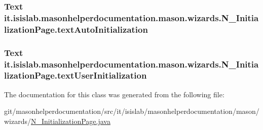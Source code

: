\hypertarget{classit_1_1isislab_1_1masonhelperdocumentation_1_1mason_1_1wizards_1_1_n___initialization_page_a839ed55d6a19462f54d279cb70a0573f}{
\subsubsection[{text\-Auto\-Initialization}]{\setlength{\rightskip}{0pt plus 5cm}Text it.\-isislab.\-masonhelperdocumentation.\-mason.\-wizards.\-N\-\_\-\-Initialization\-Page.\-text\-Auto\-Initialization\hspace{0.3cm}{\ttfamily [private]}}}\label{classit_1_1isislab_1_1masonhelperdocumentation_1_1mason_1_1wizards_1_1_n___initialization_page_a839ed55d6a19462f54d279cb70a0573f}
\hypertarget{classit_1_1isislab_1_1masonhelperdocumentation_1_1mason_1_1wizards_1_1_n___initialization_page_a331a3a5f20079206c74fce5e702d2e2c}{
\subsubsection[{text\-User\-Initialization}]{\setlength{\rightskip}{0pt plus 5cm}Text it.\-isislab.\-masonhelperdocumentation.\-mason.\-wizards.\-N\-\_\-\-Initialization\-Page.\-text\-User\-Initialization\hspace{0.3cm}{\ttfamily [private]}}}\label{classit_1_1isislab_1_1masonhelperdocumentation_1_1mason_1_1wizards_1_1_n___initialization_page_a331a3a5f20079206c74fce5e702d2e2c}


The documentation for this class was generated from the following file\-:\begin{DoxyCompactItemize}
\item 
git/masonhelperdocumentation/src/it/isislab/masonhelperdocumentation/mason/wizards/\hyperlink{_n___initialization_page_8java}{N\-\_\-\-Initialization\-Page.\-java}\end{DoxyCompactItemize}
